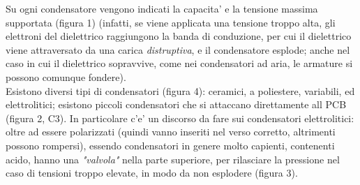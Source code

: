 \documentclass[12pt]{article}
\begin{document}
Su ogni condensatore vengono indicati la capacita' e la tensione 
massima supportata (figura 1) (infatti, se viene applicata una tensione troppo alta, gli elettroni del dielettrico raggiungono la banda di conduzione, per cui il dielettrico viene attraversato da una carica \textit{distruptiva}, e il condensatore esplode; anche nel caso in cui il dielettrico
sopravvive, come nei condensatori ad aria, le armature si possono comunque fondere). \\

Esistono diversi tipi di condensatori (figura 4): ceramici, a poliestere, variabili, ed elettrolitici; esistono piccoli condensatori che si attaccano direttamente all PCB (figura 2, C3). In particolare c'e' un discorso da fare sui condensatori elettrolitici: oltre ad essere polarizzati (quindi vanno inseriti nel verso corretto, altrimenti possono rompersi), essendo condensatori in genere molto capienti, contenenti acido, hanno una \textit{"valvola"} nella parte superiore, per rilasciare la pressione nel caso di tensioni troppo elevate, in modo da non esplodere (figura 3). \\ 
\end{document}
